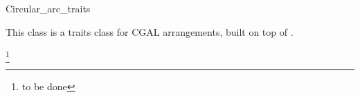 \begin{ccRefClass}{Circular_arc_traits}

\ccDefinition

This class is a traits class for CGAL arrangements, built on top of 
. 

\ccIsModel
\footnote{to be done}

\end{ccRefClass}
